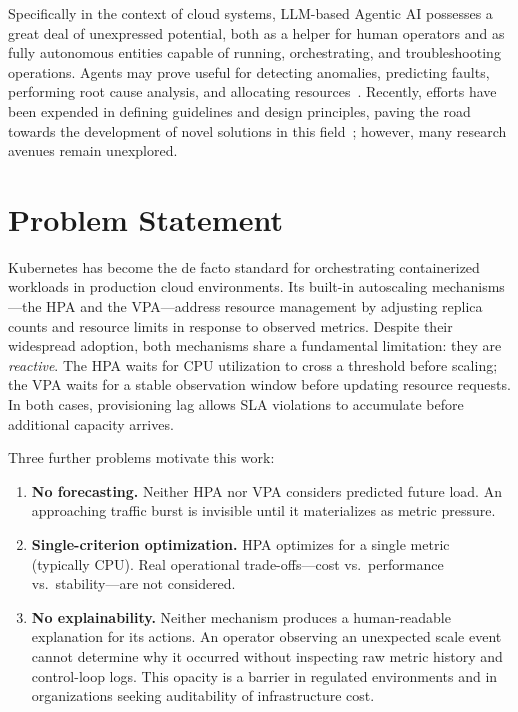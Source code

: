 Specifically in the context of cloud systems, \gls{LLM}-based Agentic AI possesses a
great deal of unexpressed potential, both as a helper for human operators and as
fully autonomous entities capable of running, orchestrating, and troubleshooting
operations. Agents may prove useful for detecting anomalies, predicting faults,
performing root cause analysis, and allocating resources~\cite{cheng2023ai}.
Recently, efforts have been expended in defining guidelines and design principles,
paving the road towards the development of novel solutions in this
field~\cite{shetty2024building}; however, many research avenues remain unexplored.

\section{Problem Statement}
\label{sec:problem}

Kubernetes has become the de facto standard for orchestrating containerized
workloads in production cloud environments. Its built-in autoscaling mechanisms—the
\gls{HPA} and the \gls{VPA}—address resource management by adjusting replica counts
and resource limits in response to observed metrics. Despite their widespread adoption,
both mechanisms share a fundamental limitation: they are \textit{reactive}. The HPA
waits for \gls{CPU} utilization to cross a threshold before scaling; the VPA waits
for a stable observation window before updating resource requests. In both cases,
provisioning lag allows SLA violations to accumulate before additional capacity
arrives.

Three further problems motivate this work:

\begin{enumerate}
  \item \textbf{No forecasting.} Neither HPA nor VPA considers predicted future load.
  An approaching traffic burst is invisible until it materializes as metric pressure.

  \item \textbf{Single-criterion optimization.} HPA optimizes for a single metric
  (typically CPU). Real operational trade-offs—cost vs.\ performance vs.\ stability—are
  not considered.

  \item \textbf{No explainability.} Neither mechanism produces a human-readable
  explanation for its actions. An operator observing an unexpected scale event cannot
  determine why it occurred without inspecting raw metric history and control-loop
  logs. This opacity is a barrier in regulated environments and in organizations
  seeking auditability of infrastructure cost.
\end{enumerate}

